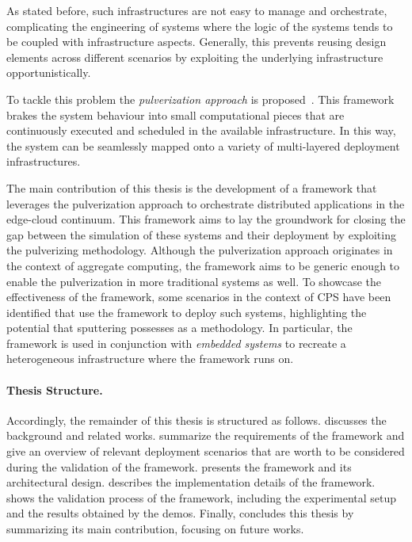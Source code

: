As stated before, such infrastructures are not easy to manage and orchestrate, complicating the engineering of systems where the logic of the
systems tends to be coupled with infrastructure aspects. Generally, this prevents reusing design elements across different scenarios by exploiting the
underlying infrastructure opportunistically.

To tackle this problem the \emph{pulverization approach} is proposed~\cite{fi12110203}. This framework brakes the system behaviour into small
computational pieces that are continuously executed and scheduled in the available infrastructure. In this way, the system can be seamlessly
mapped onto a variety of multi-layered deployment infrastructures.

The main contribution of this thesis is the development of a framework that leverages the pulverization approach to orchestrate distributed
applications in the edge-cloud continuum.
This framework aims to lay the groundwork for closing the gap between the simulation of these systems and their deployment by exploiting the
pulverizing methodology.
Although the pulverization approach originates in the context of aggregate computing, the framework aims to be generic enough to enable the
pulverization in more traditional systems as well.
To showcase the effectiveness of the framework, some scenarios in the context of CPS have been identified that use the framework to deploy such
systems, highlighting the potential that sputtering possesses as a methodology.
In particular, the framework is used in conjunction with \emph{embedded systems} to recreate a heterogeneous infrastructure where the framework
runs on.

%
\paragraph{Thesis Structure.} %
%
Accordingly, the remainder of this thesis is structured as follows.
%
 discusses the background and related works.
%
 summarize the requirements of the framework and give an overview of relevant deployment scenarios that are worth 
to be considered during the validation of the framework.
%
 presents the framework and its architectural design.
%
 describes the implementation details of the framework.
%
 shows the validation process of the framework, including the experimental setup and the results obtained by the demos.
%
Finally,  concludes this thesis by summarizing its main contribution, focusing on future works.